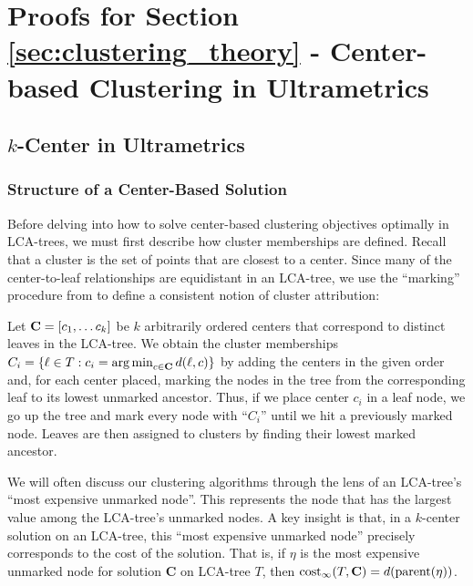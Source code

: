 \section{Proofs for Section \ref{sec:clustering_theory} - Center-based Clustering in Ultrametrics}

\subsection{$k$-Center in Ultrametrics}
\label{app:k_center_proof}

\subsubsection{Structure of a Center-Based Solution}

Before delving into how to solve center-based clustering objectives optimally in LCA-trees, we must first describe how cluster memberships are defined.
Recall that a cluster is the set of points that are closest to a center. Since many of the center-to-leaf relationships are equidistant in an LCA-tree, we use
the ``marking'' procedure from \cite{hierarchical_kmedian} to define a consistent notion of cluster attribution:

Let $\mathbf{C} = [c_1, \ldots c_k]$ be $k$ arbitrarily ordered centers that correspond to distinct leaves in the LCA-tree. We obtain the cluster memberships $C_i = \{\ell \in
T: c_i = \operatorname*{arg\,min}_{c \in \mathbf{C}} d(\ell, c)\}$ by adding the centers in the given order and, for each center placed, marking the nodes in the tree from the
corresponding leaf to its lowest unmarked ancestor. Thus, if we place center $c_i$ in a leaf node, we go up the tree and mark every node with ``$C_i$'' until we
hit a previously marked node. Leaves are then assigned to clusters by finding their lowest marked ancestor.

We will often discuss our clustering algorithms through the lens of an LCA-tree's ``most expensive unmarked node''. This represents the node that has the largest value among the LCA-tree's unmarked nodes. A key insight is that, in a $k$-center solution on an LCA-tree, this ``most expensive unmarked node'' precisely corresponds to the cost of the solution. That is, if $\eta$ is the most expensive unmarked node for solution $\mathbf{C}$ on LCA-tree $T$, then $\text{cost}_{\infty}(T, \mathbf{C}) = d(\text{parent}(\eta))$.


